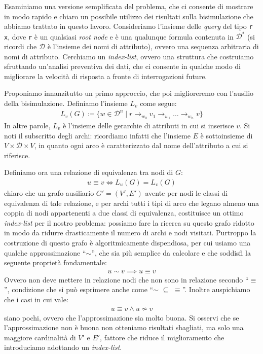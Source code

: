 Esaminiamo una versione semplificata del problema, che ci consente di mostrare in modo rapido e chiaro un possibile utilizzo dei risultati sulla bisimulazione che abbiamo trattato in questo lavoro. Consideriamo l'insieme delle \emph{query} del tipo \verb|r|  \verb|x|, dove \verb|r| è un qualsiasi \emph{root node} e  è una qualunque formula contenuta in $\mathcal{D}^*$ (si ricordi che $\mathcal{D}$ è l'insieme dei nomi di attributo), ovvero una sequenza arbitraria di nomi di attributo. Cerchiamo un \emph{index-list}, ovvero una struttura che costruiamo sfruttando un'analisi preventiva dei dati, che ci consente in qualche modo di migliorare la velocità di risposta a fronte di interrogazioni future.

Proponiamo innanzitutto un primo approccio, che poi miglioreremo con l'ausilio della bisimulazione. Definiamo l'insieme $L_v$ come segue:
\begin{gather*}
    L_v(G) \coloneqq \{w \in \mathcal{D}^n \mid r \rightarrow_{w_0} v_1 \rightarrow_{w_1} \dots \rightarrow_{w_n} v\}
\end{gather*}
In altre parole, $L_v$ è l'insieme delle gerarchie di attributi in cui si inserisce $v$. Si noti il subscritto degli archi: ricordiamo infatti che l'insieme $E$ è sottoinsieme di $V \times \mathcal{D} \times V$, in quanto ogni arco è caratterizzato dal nome dell'attributo a cui si riferisce.

Definiamo ora una relazione di equivalenza tra nodi di $G$:
\begin{gather*}
    u \equiv v \iff L_u(G) = L_v(G)
\end{gather*}
\accente chiaro che un grafo ausiliario $G'=(V',E')$ avente per nodi le classi di equivalenza di tale relazione, e per archi tutti i tipi di arco che legano almeno una coppia di nodi appartenenti a due classi di equivalenza, costituisce un ottimo \emph{index-list} per il nostro problema: possiamo fare la ricerca su questo grafo ridotto in modo da ridurre drasticamente il numero di archi e nodi visitati. Purtroppo la costruzione di questo grafo è algoritmicamente dispendiosa, per cui usiamo una qualche approssimazione ``$\sim$'', che sia più semplice da calcolare e che soddisfi la seguente proprietà fondamentale:
\begin{gather*}
    u \sim v \implies u \equiv v
\end{gather*}
Ovvero non deve mettere in relazione nodi che non sono in relazione secondo ``$\equiv$'', condizione che si può esprimere anche come ``$\sim \,\,\subseteq \,\, \equiv$''. Inoltre auspichiamo che i casi in cui vale:
\begin{gather*}
    u \equiv v \land u \not\sim v
\end{gather*}
siano pochi, ovvero che l'approssimazione sia molto buona. Si osservi che se l'approssimazione non è buona non otteniamo risultati sbagliati, ma solo una maggiore cardinalità di $V'$ e $E'$, fattore che riduce il miglioramento che introduciamo adottando un \emph{index-list}.

